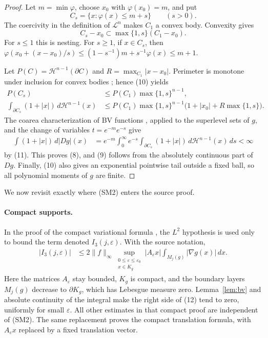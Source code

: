 \documentclass[11pt]{article}
\newcommand{\cH}{\mathcal H}
\begin{document}
\begin{proof}
Let $m=\min\varphi$, choose $x_0$ with $\varphi(x_0)=m$, and put
\[
 C_s=\{x:\varphi(x)\le m+s\}\qquad(s>0).
\]
The coercivity in the definition of $\mathcal L^n$ makes $C_1$ a convex body.
Convexity gives
\[
 C_s-x_0\subset \max\{1,s\}(C_1-x_0).
 \tag{10}
\]
For $s\le1$ this is nesting.  For $s\ge1$, if $x\in C_s$, then
\(
 \varphi(x_0+(x-x_0)/s)
 \le(1-s^{-1})m+s^{-1}\varphi(x)\le m+1.
\)

Let $P(C)=\cH^{n-1}(\partial C)$ and
$R=\max_{C_1}|x-x_0|$.  Perimeter is monotone under inclusion for convex
bodies \cite{Schneider}; hence (10) yields
\begin{align*}
 P(C_s)&\le P(C_1)\max\{1,s\}^{n-1},\\
 \int_{\partial C_s}(1+|x|)\,d\cH^{n-1}(x)
 &\le P(C_1)\max\{1,s\}^{n-1}
       \bigl(1+|x_0|+R\max\{1,s\}\bigr).
 \tag{11}
\end{align*}
The coarea characterization of BV functions \cite{EvansGariepy}, applied to
the superlevel sets of $g$, and the change of variables
$t=e^{-m}e^{-s}$ give
\begin{align*}
 \int(1+|x|)\,d|Dg|(x)
 &=e^{-m}\int_0^\infty e^{-s}
   \int_{\partial C_s}(1+|x|)\,d\cH^{n-1}(x)\,ds<\infty
\end{align*}
by (11).  This proves (8), and (9) follows from the absolutely continuous
part of $Dg$.  Finally, (10) also gives an exponential pointwise tail outside
a fixed ball, so all polynomial moments of $g$ are finite.
\end{proof}

We now revisit exactly where \textup{(SM2)} enters the source proof.

\paragraph{Compact supports.}
In the proof of the compact variational formula
\cite[Theorem 17 and Proposition 19]{HR}, the $L^2$ hypothesis is used only to
bound the term denoted $I_3(j,\varepsilon)$.  With the source notation,
\begin{align*}
|I_3(j,\varepsilon)|
&\le 2\|f\|_\infty
 \sup_{\substack{0\le\varepsilon\le\varepsilon_0\\x\in K_g}}
 |A_\varepsilon x|
 \int_{M_j(g)}|\nabla g(x)|\,dx.
 \tag{12}
\end{align*}
Here the matrices $A_\varepsilon$ stay bounded, $K_g$ is compact, and the
boundary layers $M_j(g)$ decrease to $\partial K_g$, which has Lebesgue
measure zero.  Lemma~\ref{lem:bv} and absolute continuity of the integral make
the right side of (12) tend to zero, uniformly for small $\varepsilon$.
All other estimates in that compact proof are independent of
\textup{(SM2)}.  The same replacement proves the compact translation formula,
with $A_\varepsilon x$ replaced by a fixed translation vector.
\end{document}
